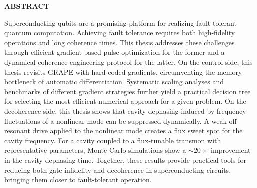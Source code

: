 \clearpage
\begin{centering}
\textbf{ABSTRACT}\\
\vspace{\baselineskip}
\end{centering}

Superconducting qubits are a promising platform for realizing fault-tolerant quantum computation. Achieving fault tolerance requires both high-fidelity operations and long coherence times. This thesis addresses these challenges through efficient gradient-based pulse optimization for the former and a dynamical coherence-engineering protocol for the latter. On the control side, this thesis revisits GRAPE with hard-coded gradients, circumventing the memory bottleneck of automatic differentiation. Systematic scaling analyses and benchmarks of different gradient strategies further yield a practical decision tree for selecting the most efficient numerical approach for a given problem. On the decoherence side, this thesis shows that cavity dephasing induced by frequency fluctuations of a nonlinear mode can be suppressed dynamically. A weak off-resonant drive applied to the nonlinear mode creates a flux sweet spot for the cavity frequency. For a cavity coupled to a flux-tunable transmon with representative parameters, Monte Carlo simulations show a \(\sim 20\times\) improvement in the cavity dephasing time. Together, these results provide practical tools for reducing both gate infidelity and decoherence in superconducting circuits, bringing them closer to fault-tolerant operation.

\clearpage
